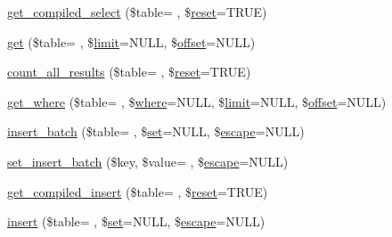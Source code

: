 \begin{DoxyCompactItemize}
\hyperlink{class_c_i___d_b__query__builder_ad02ec84bdb2bc9019a29baf0f27eb6bc}{get\+\_\+compiled\+\_\+select} (\$table= \textquotesingle{}\textquotesingle{}, \$\hyperlink{canvasjs_8js_a4603440e8345caceeed0d4f0bab77b2f}{reset}=T\+R\+U\+E)
\item 
\hyperlink{class_c_i___d_b__query__builder_a9e31f9f0d21d026e3e58b8225b79b8c1}{get} (\$table= \textquotesingle{}\textquotesingle{}, \$\hyperlink{class_c_i___d_b__query__builder_a875b0d4703f176c36e771d728a9a04a0}{limit}=N\+U\+L\+L, \$\hyperlink{class_c_i___d_b__query__builder_afd31b65425a2b5cf30711bf29e1b1851}{offset}=N\+U\+L\+L)
\item 
\hyperlink{class_c_i___d_b__query__builder_a682ce62db0b118f0803df661c82d4fd8}{count\+\_\+all\+\_\+results} (\$table= \textquotesingle{}\textquotesingle{}, \$\hyperlink{canvasjs_8js_a4603440e8345caceeed0d4f0bab77b2f}{reset}=T\+R\+U\+E)
\item 
\hyperlink{class_c_i___d_b__query__builder_a7b120c9cf6f8aac4b82750bf8f7c9f17}{get\+\_\+where} (\$table= \textquotesingle{}\textquotesingle{}, \$\hyperlink{class_c_i___d_b__query__builder_a2356c4b7b93fb83c62a354a8a0748222}{where}=N\+U\+L\+L, \$\hyperlink{class_c_i___d_b__query__builder_a875b0d4703f176c36e771d728a9a04a0}{limit}=N\+U\+L\+L, \$\hyperlink{class_c_i___d_b__query__builder_afd31b65425a2b5cf30711bf29e1b1851}{offset}=N\+U\+L\+L)
\item 
\hyperlink{class_c_i___d_b__query__builder_a1cee06687b1da4d58959993bdd69c9c2}{insert\+\_\+batch} (\$table= \textquotesingle{}\textquotesingle{}, \$\hyperlink{class_c_i___d_b__query__builder_ad24529c8e6cd4e3f58c0a3e55815b532}{set}=N\+U\+L\+L, \$\hyperlink{class_c_i___d_b__driver_ac8f37ca5703d4558c732e692194f8cd6}{escape}=N\+U\+L\+L)
\item 
\hyperlink{class_c_i___d_b__query__builder_a373d04f66d9bf73c7aceb1a925697a54}{set\+\_\+insert\+\_\+batch} (\$key, \$value= \textquotesingle{}\textquotesingle{}, \$\hyperlink{class_c_i___d_b__driver_ac8f37ca5703d4558c732e692194f8cd6}{escape}=N\+U\+L\+L)
\item 
\hyperlink{class_c_i___d_b__query__builder_ab24af8f4b84f989cc09aa7c82e9c9721}{get\+\_\+compiled\+\_\+insert} (\$table= \textquotesingle{}\textquotesingle{}, \$\hyperlink{canvasjs_8js_a4603440e8345caceeed0d4f0bab77b2f}{reset}=T\+R\+U\+E)
\item 
\hyperlink{class_c_i___d_b__query__builder_a7913ac1869e54b240f10ca866cee1878}{insert} (\$table= \textquotesingle{}\textquotesingle{}, \$\hyperlink{class_c_i___d_b__query__builder_ad24529c8e6cd4e3f58c0a3e55815b532}{set}=N\+U\+L\+L, \$\hyperlink{class_c_i___d_b__driver_ac8f37ca5703d4558c732e692194f8cd6}{escape}=N\+U\+L\+L)

\end{DoxyCompactItemize}
